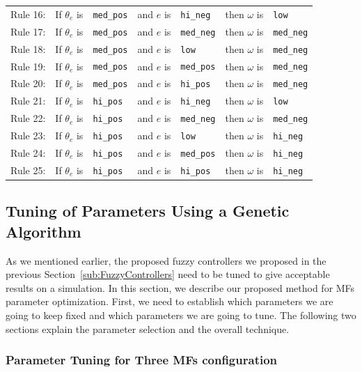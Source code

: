 \documentclass[symmetry,article,submit,moreauthors,pdftex]{Definitions/mdpi}
\begin{document}
\begin{specialtable}[H]
\begin{tabular}{lllllll}
    Rule 16: & If $\theta_e$ is	& { \tt med\_pos} &	and $e$ is	& { \tt hi\_neg}  &	then $\omega$ is & { \tt low}      \\
    Rule 17: & If $\theta_e$ is	& { \tt med\_pos} &	and $e$ is	& { \tt med\_neg} &	then $\omega$ is & { \tt med\_neg} \\
    Rule 18: & If $\theta_e$ is	& { \tt med\_pos} &	and $e$ is	& { \tt low}      &	then $\omega$ is & { \tt med\_neg} \\
    Rule 19: & If $\theta_e$ is	& { \tt med\_pos} &	and $e$ is	& { \tt med\_pos} &	then $\omega$ is & { \tt med\_neg} \\
    Rule 20: & If $\theta_e$ is	& { \tt med\_pos} &	and $e$ is  & { \tt hi\_pos}  &	then $\omega$ is & { \tt med\_neg} \\
    Rule 21: & If $\theta_e$ is	& { \tt hi\_pos}  &	and $e$ is	& { \tt hi\_neg}  &	then $\omega$ is & { \tt low}      \\
    Rule 22: & If $\theta_e$ is	& { \tt hi\_pos}  &	and $e$ is	& { \tt med\_neg} &	then $\omega$ is & { \tt med\_neg} \\
    Rule 23: & If $\theta_e$ is	& { \tt hi\_pos}  &	and $e$ is	& { \tt low}      &	then $\omega$ is & { \tt hi\_neg}  \\
    Rule 24: & If $\theta_e$ is	& { \tt hi\_pos}  &	and $e$ is	& { \tt med\_pos} &	then $\omega$ is & { \tt hi\_neg}  \\
    Rule 25: & If $\theta_e$ is	& { \tt hi\_pos}  &	and $e$ is	& { \tt hi\_pos}  &	then $\omega$ is & { \tt hi\_neg}    
       
    \end{tabular}
 \end{specialtable}

\subsection{Tuning of Parameters Using a Genetic Algorithm}%
    \label{sec:GA}

As we mentioned earlier, the proposed fuzzy controllers we proposed in the
previous Section~\ref{sub:FuzzyControllers} need to be tuned to give
acceptable results on a simulation. In this section, we describe our proposed
method for MFs parameter optimization. First, we need to establish which
parameters we are going to keep fixed and which parameters we are going to
tune. The following two sections explain the parameter selection and the
overall technique. 

\subsubsection{ Parameter Tuning for Three MFs configuration}
\end{document}
